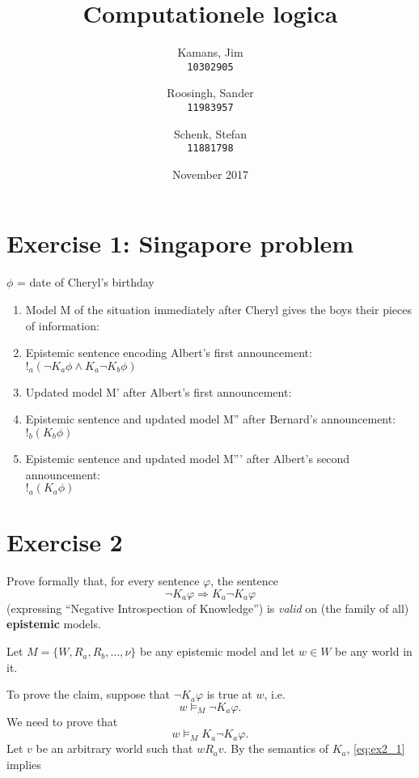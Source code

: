\documentclass[leqno]{article}
\title{Computationele logica}
\author{
    Kamans, Jim\\
    \texttt{10302905}
    \and
    Roosingh, Sander\\
    \texttt{11983957}
    \and
    Schenk, Stefan\\
    \texttt{11881798}
}
\date{November 2017}
\begin{document}
\maketitle

\section{Exercise 1: Singapore problem}

$ \phi $ = date of Cheryl's birthday

\begin{enumerate}[label=(\alph*)]
    \item Model M of the situation immediately after Cheryl gives the boys their pieces of information: \\

    \item Epistemic sentence encoding Albert's first announcement: \\
    $ !_a (\neg K_a \phi \wedge K_a \neg K_b \phi) $

    \item Updated model M' after Albert's first announcement: \\
    \item Epistemic sentence and updated model M'' after Bernard's announcement: \\
    $ !_b (K_b \phi) $
    \item Epistemic sentence and updated model M''' after Albert's second announcement: \\
    $ !_a (K_a \phi) $
\end{enumerate}

\section{Exercise 2}
Prove formally that, for every sentence \(\varphi\), the sentence
\[\neg K_{a}\varphi \Rightarrow K_{a}\neg K_{a}\varphi\]
(expressing ``Negative Introspection of Knowledge'') is \textit{valid} on (the family of all) \textbf{epistemic} models.

Let $M = \{W, R_a, R_b, \dots, \nu\}$ be any epistemic model and let $w \in W$ be any world in it.

To prove the claim, suppose that $\neg K_a \varphi$ is true at $w$, i.e.
\begin{equation}
	\tag{1} \label{eq:ex2_1}
	w \models_M \neg K_a \varphi.
\end{equation}
We need to prove that
\begin{equation}
	\tag{?} \label{eq:ex2_?}
	w \models_M K_a \neg K_a \varphi.
\end{equation}
Let $v$ be an arbitrary world such that $w R_a v$.
By the semantics of $K_a$, \eqref{eq:ex2_1} implies
\end{document}

